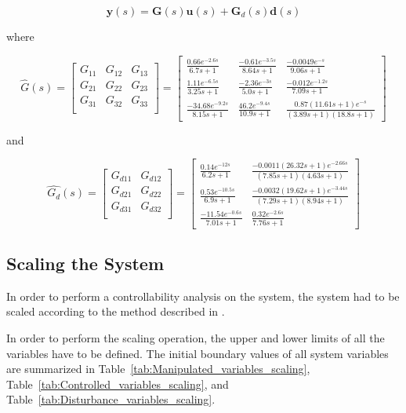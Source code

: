 \begin{equation}
\textbf{y}(s) = \textbf{G}(s)\textbf{u}(s) + \textbf{G}_{d}(s)\textbf{d}(s)
\end{equation}

where

\begin{equation}
\hat{G}(s) = \begin{bmatrix}
G_{11} & G_{12} & G_{13} \\
G_{21} & G_{22} & G_{23} \\
G_{31} & G_{32} & G_{33} \\
\end{bmatrix} = \begin{bmatrix}
\frac{0.66e^{-2.6s}}{6.7s+1} & \frac{-0.61e^{-3.5s}}{8.64s+1} & \frac{-0.0049e^{-s}}{9.06s+1} \\
\frac{1.11e^{-6.5s}}{3.25s+1} & \frac{-2.36e^{-3s}}{5.0s+1} & \frac{-0.012e^{-1.2s}}{7.09s+1} \\
\frac{-34.68e^{-9.2s}}{8.15s+1} & \frac{46.2e^{-9.4s}}{10.9s+1} & \frac{0.87(11.61s+1)e^{-s}}{(3.89s+1)(18.8s+1)}
\end{bmatrix}
\end{equation}

and

\begin{equation}
\hat{G_d}(s) = \begin{bmatrix}
G_{d11} & G_{d12} \\
G_{d21} & G_{d22} \\
G_{d31} & G_{d32} \\
\end{bmatrix} = \begin{bmatrix}
\frac{0.14e^{-12s}}{6.2s+1} & \frac{-0.0011(26.32s+1)e^{-2.66s}}{(7.85s+1)(4.63s+1)} \\
\frac{0.53e^{-10.5s}}{6.9s+1} & \frac{-0.0032(19.62s+1)e^{-3.44s}}{(7.29s+1)(8.94s+1)} \\
\frac{-11.54e^{-0.6s}}{7.01s+1} & \frac{0.32e^{-2.6s}}{7.76s+1}
\end{bmatrix}
\end{equation}

\subsection{Scaling the System}
\label{sec:Scaling}
In order to perform a controllability analysis on the system, the system had to be scaled according to the method described in \textcite{skogestad}.

In order to perform the scaling operation, the upper and lower limits of all the variables have to be defined. The initial boundary values of all system variables are summarized in Table~\ref{tab:Manipulated_variables_scaling}, Table~\ref{tab:Controlled_variables_scaling}, and Table~\ref{tab:Disturbance_variables_scaling}.

